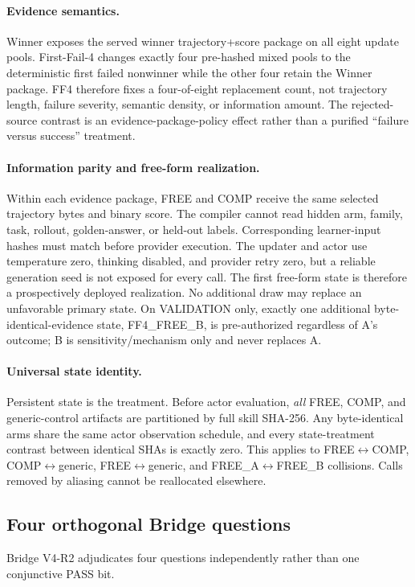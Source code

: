 \paragraph{Evidence semantics.}
Winner exposes the served winner trajectory+score package on all eight update pools. First-Fail-4 changes exactly four pre-hashed mixed pools to the deterministic first failed nonwinner while the other four retain the Winner package. FF4 therefore fixes a four-of-eight replacement count, not trajectory length, failure severity, semantic density, or information amount. The rejected-source contrast is an evidence-package-policy effect rather than a purified ``failure versus success'' treatment.

\paragraph{Information parity and free-form realization.}
Within each evidence package, FREE and COMP receive the same selected trajectory bytes and binary score. The compiler cannot read hidden arm, family, task, rollout, golden-answer, or held-out labels. Corresponding learner-input hashes must match before provider execution. The updater and actor use temperature zero, thinking disabled, and provider retry zero, but a reliable generation seed is not exposed for every call. The first free-form state is therefore a prospectively deployed realization. No additional draw may replace an unfavorable primary state. On VALIDATION only, exactly one additional byte-identical-evidence state, FF4\_FREE\_B, is pre-authorized regardless of A's outcome; B is sensitivity/mechanism only and never replaces A.

\paragraph{Universal state identity.}
Persistent state is the treatment. Before actor evaluation, \emph{all} FREE, COMP, and generic-control artifacts are partitioned by full skill SHA-256. Any byte-identical arms share the same actor observation schedule, and every state-treatment contrast between identical SHAs is exactly zero. This applies to FREE$\leftrightarrow$COMP, COMP$\leftrightarrow$generic, FREE$\leftrightarrow$generic, and FREE\_A$\leftrightarrow$FREE\_B collisions. Calls removed by aliasing cannot be reallocated elsewhere.

\subsection{Four orthogonal Bridge questions}
Bridge V4-R2 adjudicates four questions independently rather than one conjunctive PASS bit.

